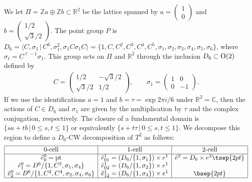 \documentclass[pdftex]{sigma}
\theoremstyle{definition}
\newcommand{\C}{\mathbb{C}}
\newcommand{\R}{\mathbb{R}}
\newcommand{\Z}{\mathbb{Z}}
\newcommand{\pt}{\mathrm{pt}}
\begin{document}
We let $\Pi = \Z a \oplus \Z b \subset \R^2$ be the lattice spanned by
$a = \left( \begin{matrix} 1 \\ 0 \end{matrix} \right)$ and
$b = \left( \begin{matrix} 1/2 \\ \sqrt{3}/2 \end{matrix} \right)$.
The point group $P$ is
$D_6 =\langle C, \sigma_1 \,|\, C^6, \sigma_1^2, \sigma_1C\sigma_1C \rangle=
\{1, C, C^2, C^3, C^4, C^5,\sigma_1, \sigma_2, \sigma_3, \sigma_4, \sigma_5, \sigma_6\}$, where $\sigma_\ell = C^{\ell - 1}\sigma_1$. This group acts on $\Pi$ and $\R^2$ through the inclusion $D_6 \subset {\rm O}(2)$ def\/ined by
\begin{gather*}
C = \left(
\begin{matrix}
1/2 & -\sqrt{3}/2 \\
\sqrt{3}/2 & 1/2
\end{matrix}
\right), \qquad \sigma_1 =
\left(
\begin{matrix}
1 & 0 \\
0 & -1
\end{matrix}
\right).
\end{gather*}
If we use the identif\/ications $a = 1$ and $b = \tau = \exp 2\pi i/6$ under $\R^2 = \C$, then the actions of $C \in D_6$ and $\sigma_1$ are given by the multiplication by $\tau$ and the complex conjugation, respectively. The closure of a fundamental domain is $\{ s a + t b \,|\, 0 \le s, t \le 1 \}$ or equivalently $\{ s + t \tau \,|\, 0 \le s, t \le 1 \}$. We decompose this region to def\/ine a $D_6$-CW decomposition of $T^2$ as follows:
$$
\begin{array}{|c|c|c|}
\hline
\mbox{0-cell} & \mbox{1-cell} & \mbox{2-cell} \\
\hline
\tilde{e}^0_0 = \pt &
\tilde{e}^1_{01} = (D_6/\{ 1, \sigma_1 \}) \times e^1 &
\tilde{e}^2 = D_6 \times e^2 \tsep{2pt}\\
\tilde{e}^0_1 = D^6/\{ 1, C^3, \sigma_1, \sigma_4 \} &
\tilde{e}^1_{02} = (D_6/\{ 1, \sigma_2 \}) \times e^1 & \\
\tilde{e}^0_2 = D^6/\{ 1, C^2, C^4, \sigma_2, \sigma_4, \sigma_6 \} &
\tilde{e}^1_{12} = (D_6/\{ 1, \sigma_4 \}) \times e^1 & \bsep{2pt}\\
\hline
\end{array}
$$
\end{document}
